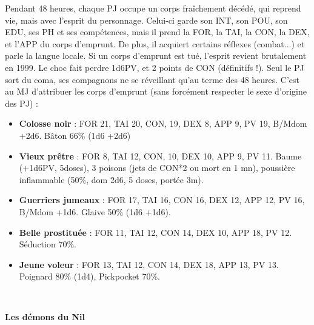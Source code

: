 \documentclass[11pt,twoside,a4paper]{book}
\begin{document}
Pendant 48 heures, chaque PJ occupe un corps fra{\^i}chement d{\'e}c{\'e}d{\'e}, qui reprend vie, mais avec l'esprit du personnage. Celui-ci garde son INT, son POU, son EDU, ses PH et ses comp{\'e}tences, mais il prend la FOR, la TAI, la CON, la DEX, et l'APP du corps d'emprunt. De plus, il acquiert certains r{\'e}flexes (combat...) et parle la langue locale. Si un corps d'emprunt est tu{\'e}, l'esprit revient brutalement en 1999. Le choc fait perdre 1d6PV, et 2 points de CON (d{\'e}finitifs !). Seul le PJ sort du coma, ses compagnons ne se r{\'e}veillant qu'au terme des 48 heures. C'est au MJ d'attribuer les corps d'emprunt (sans forc{\'e}ment respecter le sexe d'origine des PJ) :
\setlength\parindent{20pt}
\begin{itemize}
	\item \textbf{Colosse noir} : FOR 21, TAI 20, CON, 19, DEX 8, APP 9, PV 19, B/Mdom +2d6. B{\^a}ton 66\% (1d6 +2d6)
	\item \textbf{Vieux pr{\^e}tre} : FOR 8, TAI 12, CON, 10, DEX 10, APP 9, PV 11. Baume (+1d6PV, 5doses), 3 poisons (jets de CON*2 ou mort en 1 mn), poussi{\`e}re inflammable (50\%, dom 2d6, 5 doses, port{\'e}e 3m).
	\item \textbf{Guerriers jumeaux} : FOR 17, TAI 16, CON 16, DEX 12, APP 12, PV 16, B/Mdom +1d6. Glaive 50\% (1d6 +1d6).
	\item \textbf{Belle prostitu{\'e}e} : FOR 11, TAI 12, CON 14, DEX 10, APP 18, PV 12. S{\'e}duction 70\%.
	\item \textbf{Jeune voleur} : FOR 13, TAI 12, CON 14, DEX 18, APP 13, PV 13. Poignard 80\% (1d4), Pickpocket 70\%.
\end{itemize}~\\
\setlength\parindent{0pt}

\textbf{\large Les d{\'e}mons du Nil}~\\
\end{document}
